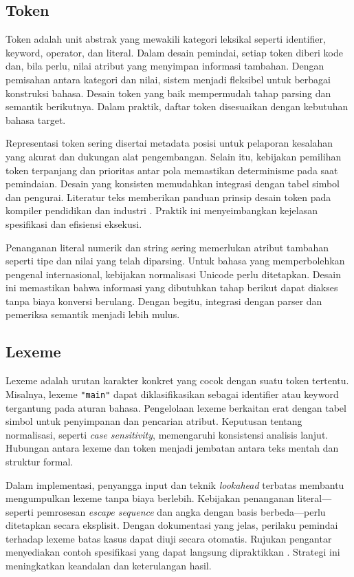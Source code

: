\documentclass[../main.tex]{subfiles}
\begin{document}
\subsection{Token}
Token adalah unit abstrak yang mewakili kategori leksikal seperti identifier, keyword, operator, dan literal. Dalam desain pemindai, setiap token diberi kode dan, bila perlu, nilai atribut yang menyimpan informasi tambahan. Dengan pemisahan antara kategori dan nilai, sistem menjadi fleksibel untuk berbagai konstruksi bahasa. Desain token yang baik mempermudah tahap parsing dan semantik berikutnya. Dalam praktik, daftar token disesuaikan dengan kebutuhan bahasa target.

Representasi token sering disertai metadata posisi untuk pelaporan kesalahan yang akurat dan dukungan alat pengembangan. Selain itu, kebijakan pemilihan token terpanjang dan prioritas antar pola memastikan determinisme pada saat pemindaian. Desain yang konsisten memudahkan integrasi dengan tabel simbol dan pengurai. Literatur teks memberikan panduan prinsip desain token pada kompiler pendidikan dan industri \citep{Mogensen2010,CS143}. Praktik ini menyeimbangkan kejelasan spesifikasi dan efisiensi eksekusi.

Penanganan literal numerik dan string sering memerlukan atribut tambahan seperti tipe dan nilai yang telah diparsing. Untuk bahasa yang memperbolehkan pengenal internasional, kebijakan normalisasi Unicode perlu ditetapkan. Desain ini memastikan bahwa informasi yang dibutuhkan tahap berikut dapat diakses tanpa biaya konversi berulang. Dengan begitu, integrasi dengan parser dan pemeriksa semantik menjadi lebih mulus.

\subsection{Lexeme}
Lexeme adalah urutan karakter konkret yang cocok dengan suatu token tertentu. Misalnya, lexeme \texttt{"main"} dapat diklasifikasikan sebagai identifier atau keyword tergantung pada aturan bahasa. Pengelolaan lexeme berkaitan erat dengan tabel simbol untuk penyimpanan dan pencarian atribut. Keputusan tentang normalisasi, seperti \emph{case sensitivity}, memengaruhi konsistensi analisis lanjut. Hubungan antara lexeme dan token menjadi jembatan antara teks mentah dan struktur formal.

Dalam implementasi, penyangga input dan teknik \emph{lookahead} terbatas membantu mengumpulkan lexeme tanpa biaya berlebih. Kebijakan penanganan literal—seperti pemrosesan \emph{escape sequence} dan angka dengan basis berbeda—perlu ditetapkan secara eksplisit. Dengan dokumentasi yang jelas, perilaku pemindai terhadap lexeme batas kasus dapat diuji secara otomatis. Rujukan pengantar menyediakan contoh spesifikasi yang dapat langsung dipraktikkan \citep{FlexManual,Mogensen2010}. Strategi ini meningkatkan keandalan dan keterulangan hasil.
\end{document}
